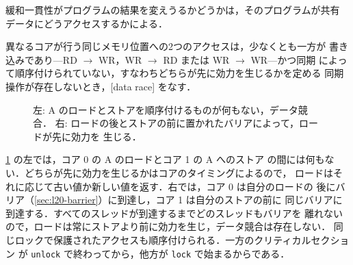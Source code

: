 \documentclass[../main.tex]{subfiles}
\begin{document}
緩和一貫性がプログラムの結果を変えうるかどうかは，そのプログラムが共有
データにどうアクセスするかによる．

\begin{definition}[データ競合]
  異なるコアが行う同じメモリ位置への2つのアクセスは，少なくとも一方が
  書き込みであり---RD $\to$ WR，WR $\to$ RD または WR $\to$ WR---かつ同期
  によって順序付けられていない，すなわちどちらが先に効力を生じるかを定める
  同期操作が存在しないとき，[data race]%
  をなす．
\end{definition}

\begin{figure}[htbp]
  \centering
  
  \caption{左: A のロードとストアを順序付けるものが何もない，データ競合．
    右: ロードの後とストアの前に置かれたバリアによって，ロードが先に効力を
    生じる．}
  \label{fig:l21-race}
\end{figure}

\cref{fig:l21-race} の左では，コア 0 の A のロードとコア 1 の A へのストア
の間には何もない．どちらが先に効力を生じるかはコアのタイミングによるので，
ロードはそれに応じて古い値か新しい値を返す．右では，コア 0 は自分のロードの
後にバリア（\cref{sec:l20-barrier}）に到達し，コア 1 は自分のストアの前に
同じバリアに到達する．すべてのスレッドが到達するまでどのスレッドもバリアを
離れないので，ロードは常にストアより前に効力を生じ，データ競合は存在しない．
同じロックで保護されたアクセスも順序付けられる．一方のクリティカルセクション
が \texttt{unlock} で終わってから，他方が \texttt{lock} で始まるからである．
\end{document}

